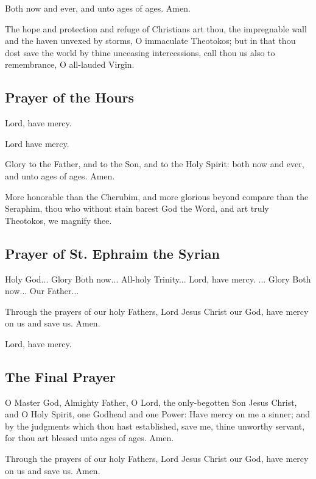 Both now and ever, and unto ages of ages. Amen.

The hope and protection and refuge of Christians art thou, the impregnable wall and the haven unvexed by storms, O immaculate Theotokos; but in that thou dost save the world by thine unceasing intercessions, call thou us also to remembrance, O all-lauded Virgin.


\subsection{Prayer of the Hours}

Lord, have mercy. 



Lord have mercy. 

Glory to the Father, and to the Son, and to the Holy Spirit: both now and ever, and unto ages of ages. Amen.

More honorable than the Cherubim, and more glorious beyond compare than the Seraphim, thou who without stain barest God the Word, and art truly Theotokos, we magnify thee.

\subsection{Prayer of St. Ephraim the Syrian}




Holy God... Glory  Both now... All-holy Trinity... Lord, have mercy. ... Glory  Both now... Our Father...

Through the prayers of our holy Fathers, Lord Jesus Christ our God, have mercy on us and save us. Amen.

Lord, have mercy. 

\subsection{The Final Prayer}

O Master God, Almighty Father, O Lord, the only-begotten Son Jesus Christ, and O Holy Spirit, one Godhead and one Power: Have mercy on me a sinner; and by the judgments which thou hast established, save me, thine unworthy servant, for thou art blessed unto ages of ages. Amen.

Through the prayers of our holy Fathers, Lord Jesus Christ our God, have mercy on us and save us. Amen.

\cleardoublepage
